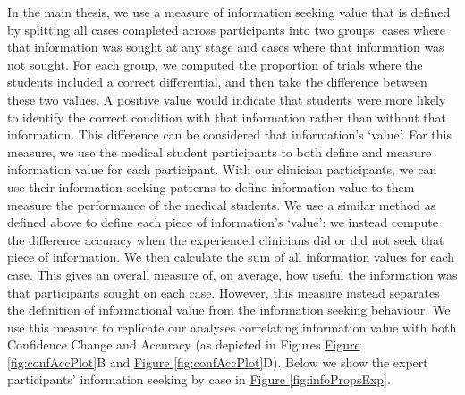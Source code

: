 \documentclass[a4paper, nobind]{templates/ociamthesis}
\begin{document}
In the main thesis, we use a measure of information seeking value that is defined by splitting all cases completed across participants into two groups: cases where that information was sought at any stage and cases where that information was not sought. For each group, we computed the proportion of trials where the students included a correct differential, and then take the difference between these two values. A positive value would indicate that students were more likely to identify the correct condition with that information rather than without that information. This difference can be considered that information's `value'. For this measure, we use the medical student participants to both define and measure information value for each participant. With our clinician participants, we can use their information seeking patterns to define information value to them measure the performance of the medical students. We use a similar method as defined above to define each piece of information's `value': we instead compute the difference accuracy when the experienced clinicians did or did not seek that piece of information. We then calculate the sum of all information values for each case. This gives an overall measure of, on average, how useful the information was that participants sought on each case. However, this measure instead separates the definition of informational value from the information seeking behaviour. We use this measure to replicate our analyses correlating information value with both Confidence Change and Accuracy (as depicted in Figures \hyperref[fig:confAccPlot]{Figure \ref{fig:confAccPlot}}B and \hyperref[fig:confAccPlot]{Figure \ref{fig:confAccPlot}}D). Below we show the expert participants' information seeking by case in \hyperref[fig:infoPropsExp]{Figure \ref{fig:infoPropsExp}}.
\end{document}
